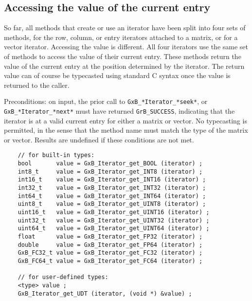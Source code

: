 \documentclass[12pt]{article}
\begin{document}
\subsection{Accessing the value of the current entry}
\label{getvalu}

So far, all methods that create or use an iterator have been split into four
sets of methods, for the row, column, or entry iterators attached to a matrix,
or for a vector iterator.  Accessing the value is different.  All four
iterators use the same set of methods to access the value of their current
entry.  These methods return the value of the current entry at the position
determined by the iterator.  The return value can of course be typecasted
using standard C syntax once the value is returned to the caller.

Preconditions: on input, the prior call to \verb'GxB_*Iterator_*seek*', or
\verb'GxB_*Iterator_*next*' must have returned \verb'GrB_SUCCESS', indicating
that the iterator is at a valid current entry for either a matrix or vector.
No typecasting is permitted, in the sense that the method name must match the
type of the matrix or vector.
Results are undefined if these conditions are not met.

    {\footnotesize
    \begin{verbatim}
    // for built-in types:
    bool       value = GxB_Iterator_get_BOOL (iterator) ;
    int8_t     value = GxB_Iterator_get_INT8 (iterator) ;
    int16_t    value = GxB_Iterator_get_INT16 (iterator) ;
    int32_t    value = GxB_Iterator_get_INT32 (iterator) ;
    int64_t    value = GxB_Iterator_get_INT64 (iterator) ;
    uint8_t    value = GxB_Iterator_get_UINT8 (iterator) ;
    uint16_t   value = GxB_Iterator_get_UINT16 (iterator) ;
    uint32_t   value = GxB_Iterator_get_UINT32 (iterator) ;
    uint64_t   value = GxB_Iterator_get_UINT64 (iterator) ;
    float      value = GxB_Iterator_get_FP32 (iterator) ;
    double     value = GxB_Iterator_get_FP64 (iterator) ;
    GxB_FC32_t value = GxB_Iterator_get_FC32 (iterator) ;
    GxB_FC64_t value = GxB_Iterator_get_FC64 (iterator) ;

    // for user-defined types:
    <type> value ;
    GxB_Iterator_get_UDT (iterator, (void *) &value) ; \end{verbatim}}

\newpage
\end{document}
